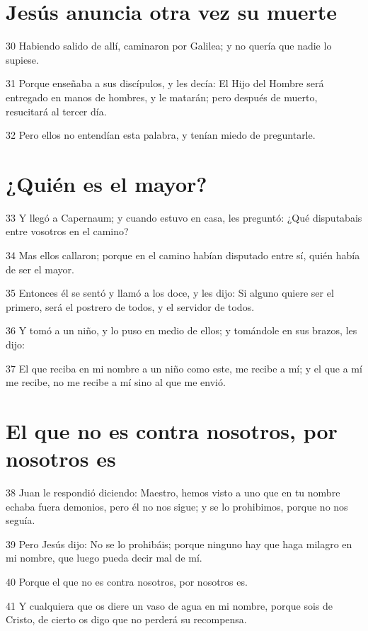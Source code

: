 \section*{Jesús anuncia otra vez su muerte}

\par 30 Habiendo salido de allí, caminaron por Galilea; y no quería que nadie lo supiese.
\par 31 Porque enseñaba a sus discípulos, y les decía: El Hijo del Hombre será entregado en manos de hombres, y le matarán; pero después de muerto, resucitará al tercer día.
\par 32 Pero ellos no entendían esta palabra, y tenían miedo de preguntarle.

\section*{¿Quién es el mayor?}

\par 33 Y llegó a Capernaum; y cuando estuvo en casa, les preguntó: ¿Qué disputabais entre vosotros en el camino?
\par 34 Mas ellos callaron; porque en el camino habían disputado entre sí, quién había de ser el mayor.
\par 35 Entonces él se sentó y llamó a los doce, y les dijo: Si alguno quiere ser el primero, será el postrero de todos, y el servidor de todos.
\par 36 Y tomó a un niño, y lo puso en medio de ellos; y tomándole en sus brazos, les dijo:
\par 37 El que reciba en mi nombre a un niño como este, me recibe a mí; y el que a mí me recibe, no me recibe a mí sino al que me envió.

\section*{El que no es contra nosotros, por nosotros es}

\par 38 Juan le respondió diciendo: Maestro, hemos visto a uno que en tu nombre echaba fuera demonios, pero él no nos sigue; y se lo prohibimos, porque no nos seguía.
\par 39 Pero Jesús dijo: No se lo prohibáis; porque ninguno hay que haga milagro en mi nombre, que luego pueda decir mal de mí.
\par 40 Porque el que no es contra nosotros, por nosotros es.
\par 41 Y cualquiera que os diere un vaso de agua en mi nombre, porque sois de Cristo, de cierto os digo que no perderá su recompensa.

